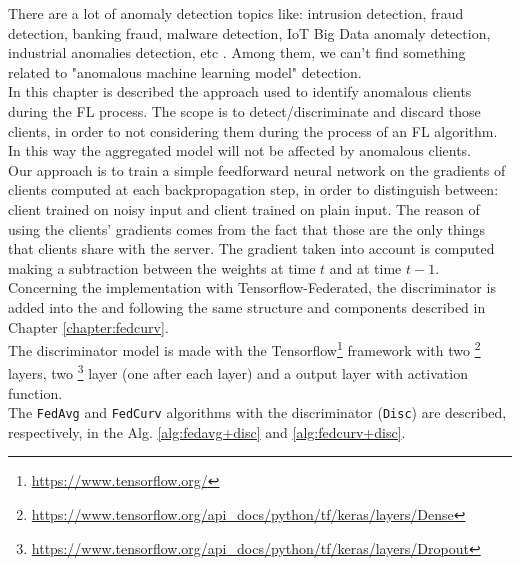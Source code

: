 There are a lot of anomaly detection topics like: intrusion detection, fraud detection, banking fraud, malware detection, IoT Big Data anomaly detection, industrial anomalies detection, etc \cite{chalapathy2019deep}. Among them, we can't find something related to "anomalous machine learning model" detection. \\

In this chapter is described the approach used to identify anomalous clients during the FL process. The scope is to detect/discriminate and discard those clients, in order to not considering them during the process of an FL algorithm. In this way the aggregated model will not be affected by anomalous clients. \\

Our approach is to train a simple feedforward neural network on the gradients of clients computed at each backpropagation step, in order to distinguish between: client trained on noisy input and client trained on plain input. The reason of using the clients' gradients comes from the fact that those are the only things that clients share with the server. The gradient taken into account is computed making a subtraction between the weights at time $t$ and at time $t-1$. Concerning the implementation with Tensorflow-Federated, the discriminator is added into the  and following the same structure and components described in Chapter \ref{chapter:fedcurv}. \\

The discriminator model is made with the Tensorflow\footnote{\url{https://www.tensorflow.org/}} framework with two \footnote{\url{https://www.tensorflow.org/api_docs/python/tf/keras/layers/Dense}} layers, two \footnote{\url{https://www.tensorflow.org/api_docs/python/tf/keras/layers/Dropout}} layer (one after each  layer) and a  output layer with  activation function. \\

The \texttt{FedAvg} and \texttt{FedCurv} algorithms with the discriminator (\texttt{Disc}) are described, respectively, in the Alg. \ref{alg:fedavg+disc} and \ref{alg:fedcurv+disc}.


